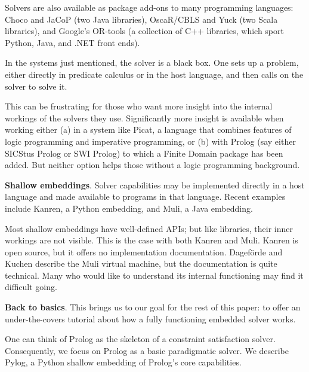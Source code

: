 Solvers are also available as package add-ons to many programming languages: Choco\cite{prud2019choco} and JaCoP\cite{kuchcinski2013jacop} (two Java libraries), OscaR/CBLS\cite{Oscar} and Yuck\cite{Yuck} (two Scala libraries), and Google's OR-tools\cite{Google-OR-tools} (a collection of C++ libraries, which sport Python, Java, and .NET front ends).

In the systems just mentioned, the solver is a black box. One sets up a problem, either directly in predicate calculus or in the host language, and then calls on the solver to solve it. 

This can be frustrating for those who want more insight into the internal workings of the solvers they use. Significantly more insight is available when working either (a) in a system like Picat\cite{zhou2015constraint}, a language that combines features of logic programming and imperative programming, or (b) with Prolog (say either SICStus Prolog\cite{carlsson2014sicstus} or SWI Prolog\cite{swi-prolog}) to which a Finite Domain package has been added. But neither option helps those without a logic programming background. 

\smallv\noindent\textbf{Shallow embeddings}.  Solver capabilities may be implemented directly in a host language and made available to programs in that language.\cite{hoare1998unifying, gibbons2014folding} Recent examples include Kanren\cite{Rocklin2019}, a Python embedding, and Muli\cite{dageforde2018constraint}, a Java embedding.

Most shallow embeddings have well-defined APIs; but like libraries, their inner workings are not visible. This is the case with both Kanren and Muli. Kanren is open source, but it offers no implementation documentation. Dagef{\"o}rde and Kuchen describe the Muli virtual machine\cite{dageforde2019compiler}, but the documentation is quite technical. Many who would like to understand its internal functioning may find it difficult going. 

\smallv\noindent\textbf{Back to basics}. This brings us to our goal for the rest of this paper: to offer an under-the-covers tutorial about how a fully functioning embedded solver works. 

One can think of Prolog as the skeleton of a constraint satisfaction solver. Consequently, we focus on Prolog as a basic paradigmatic solver. We describe Pylog, a Python shallow embedding of Prolog's core capabilities. 

